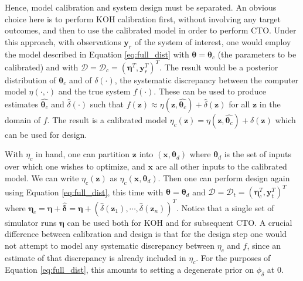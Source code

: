 \documentclass[12pt]{article}
\begin{document}
%
Hence, model calibration and system design must be separated.
%
An obvious choice here is to perform KOH calibration first, without involving any target outcomes, and then to use the calibrated model in order to perform CTO.
%
Under this approach, with observations $
\mathbf y_r$ of the system of interest, one would employ the model described in Equation \eqref{eq:full_dist} with $\boldsymbol \theta = \boldsymbol \theta_c$ (the parameters to be calibrated) and with $\mathcal D = \mathcal D_c = (\boldsymbol\eta^T, \mathbf y_r ^T)^T$.
%
The result would be a posterior distribution of $\boldsymbol \theta_c$ and of $\delta(\cdot)$, the systematic discrepancy between the computer model $\eta(\cdot,\cdot)$ and the true system $f(\cdot)$.
%
These can be used to produce estimates $\widehat{\boldsymbol\theta_c}$ and $\widehat\delta(\cdot)$ such that $f(\mathbf z)\approx\eta(\mathbf z,\widehat{\boldsymbol\theta_c})+\widehat\delta(\mathbf z)$ for all $\mathbf z$ in the domain of $f$.
%
The result is a calibrated model $\eta_c(\mathbf z)=\eta(\mathbf z,\widehat{\boldsymbol\theta_c})+\widehat\delta(\mathbf z)$ which can be used for design.
%

%
With $\eta_c$ in hand, one can partition $\mathbf z$ into $(\mathbf x,\boldsymbol\theta_d)$ where $\boldsymbol\theta_d$ is the set of inputs over which one wishes to optimize, and $\mathbf x$ are all other inputs to the calibrated model.
%
We can write $\eta_c(\mathbf z)$ as $\eta_c(\mathbf x,\boldsymbol\theta_d)$.
%
Then one can perform design again using Equation \eqref{eq:full_dist}, this time with $\boldsymbol\theta = \boldsymbol\theta_d$ and $\mathcal D = \mathcal D_t = (\boldsymbol\eta_c^T,\mathbf y_t^T)^T$ where $\boldsymbol\eta_c = \boldsymbol \eta+ \widehat{\boldsymbol \delta}= \boldsymbol \eta+ (\widehat\delta(\mathbf z_1), \cdots, \widehat\delta(\mathbf z_n))^T.$
%
Notice that a single set of simulator runs $\boldsymbol\eta$ can be used both for KOH and for subsequent CTO.
%
A crucial difference between calibration and design is that for the design step one would not attempt to model any systematic discrepancy between $\eta_c$ and $f$, since an estimate of that discrepancy is already included in $\eta_c$.
%
For the purposes of Equation \eqref{eq:full_dist}, this amounts to setting a degenerate prior on $\phi_\delta$ at 0.
%
\end{document}
